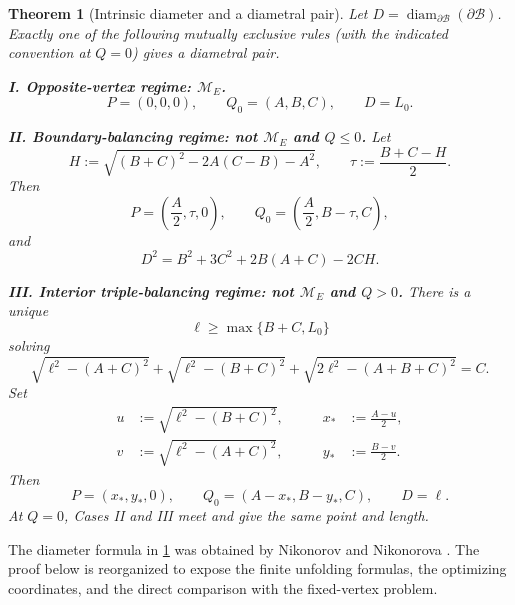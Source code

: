 \documentclass[11pt]{article}
\newtheorem{theorem}{Theorem}[section]
\theoremstyle{definition}
\newcommand{\Surf}{\partial\mathcal B}
\newcommand{\diamS}{\operatorname{diam}_{\Surf}}
\begin{document}
\begin{theorem}[Intrinsic diameter and a diametral pair]\label{thm:diam-summary}
Let $D=\diamS(\Surf)$.  Exactly one of the following mutually exclusive rules
(with the indicated convention at $Q=0$) gives a diametral pair.

\medskip
\noindent\textbf{I. Opposite-vertex regime: $\mathcal M_E$.}
\[
  P=(0,0,0),\qquad Q_0=(A,B,C),\qquad D=L_0.
\]

\medskip
\noindent\textbf{II. Boundary-balancing regime: not $\mathcal M_E$ and $Q\le0$.}
Let
\begin{equation}\label{eq:Htau}
  H:=\sqrt{(B+C)^2-2A(C-B)-A^2},
  \qquad \tau:=\frac{B+C-H}{2}.
\end{equation}
Then
\begin{equation}\label{eq:boundary-pair}
  P=\left(\frac A2,\tau,0\right),\qquad
  Q_0=\left(\frac A2,B-\tau,C\right),
\end{equation}
and
\begin{equation}\label{eq:boundary-D}
  D^2=B^2+3C^2+2B(A+C)-2CH.
\end{equation}

\medskip
\noindent\textbf{III. Interior triple-balancing regime: not $\mathcal M_E$ and $Q>0$.}
There is a unique
\begin{equation}\label{eq:ell-domain}
  \ell\ge\max\{B+C,L_0\}
\end{equation}
solving
\begin{equation}\label{eq:root}
\boxed{
 \sqrt{\ell^2-(A+C)^2}
 +\sqrt{\ell^2-(B+C)^2}
 +\sqrt{2\ell^2-(A+B+C)^2}=C.}
\end{equation}
Set
\begin{equation}\label{eq:uvxy}
\begin{aligned}
  u&:=\sqrt{\ell^2-(B+C)^2}, &\qquad x_*&:=\frac{A-u}{2},\\
  v&:=\sqrt{\ell^2-(A+C)^2}, &\qquad y_*&:=\frac{B-v}{2}.
\end{aligned}
\end{equation}
Then
\begin{equation}\label{eq:interior-pair}
  P=(x_*,y_*,0),\qquad Q_0=(A-x_*,B-y_*,C),\qquad D=\ell.
\end{equation}
At $Q=0$, Cases II and III meet and give the same point and length.
\end{theorem}

The diameter formula in 
\cref{thm:diam-summary} was obtained by Nikonorov and Nikonorova
\cite{nikonorov2008diameter}.  The proof below is reorganized to expose the
finite unfolding formulas, the optimizing coordinates, and the direct
comparison with the fixed-vertex problem.
\end{document}
